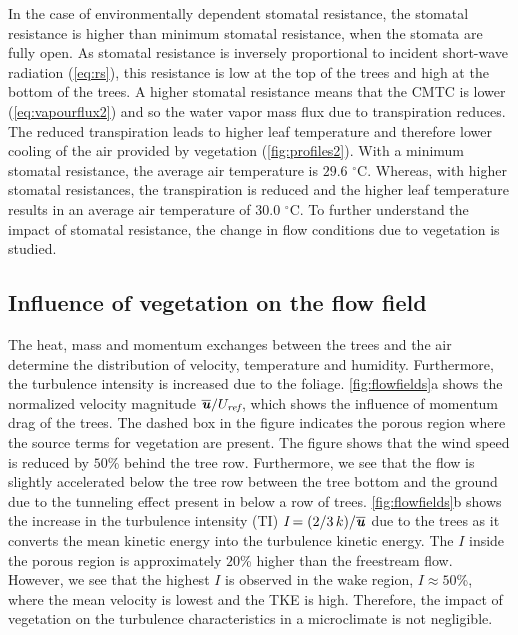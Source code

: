 In the case of environmentally dependent stomatal resistance, the stomatal resistance is higher than minimum stomatal resistance, when the stomata are fully open. As stomatal resistance is inversely proportional to incident short-wave radiation (\cref{eq:rs}), this resistance is low at the top of the trees and high at the bottom of the trees. A higher stomatal resistance means that the CMTC is lower (\cref{eq:vapourflux2}) and so the water vapor mass flux due to transpiration reduces. The reduced transpiration leads to higher leaf temperature and therefore lower cooling of the air provided by vegetation (\cref{fig:profiles2}). With a minimum stomatal resistance, the average air temperature is $29.6$ $^{\circ}$C. Whereas, with higher stomatal resistances, the transpiration is reduced and the higher leaf temperature results in an average air temperature of $30.0$ $^{\circ}$C. To further understand the impact of stomatal resistance, the change in flow conditions due to vegetation is studied.

\subsection{Influence of vegetation on the flow field}

The heat, mass and momentum exchanges between the trees and the air determine the distribution of velocity, temperature and humidity. Furthermore, the turbulence intensity is increased due to the foliage. \cref{fig:flowfields}a shows the normalized velocity magnitude $\overline{\textbf{\textit{u}}}/U_{\textit{ref}}$, which shows the influence of momentum drag of the trees. The dashed box in the figure indicates the porous region where the source terms for vegetation are present. The figure shows that the wind speed is reduced by $50$\% behind the tree row. Furthermore, we see that the flow is slightly accelerated below the tree row between the tree bottom and the ground due to the tunneling effect present in below a row of trees. \cref{fig:flowfields}b shows the increase in the turbulence intensity (TI) $\textit{I}=(2/3\,k)/\overline{\textbf{\textit{u}}}$ due to the trees as it converts the mean kinetic energy into the turbulence kinetic energy. The $I$ inside the porous region is approximately $20$\% higher than the freestream flow. However, we see that the highest $I$ is observed in the wake region, $I\approx50$\%, where the mean velocity is lowest and the TKE is high. Therefore, the impact of vegetation on the turbulence characteristics in a microclimate is not negligible. 

